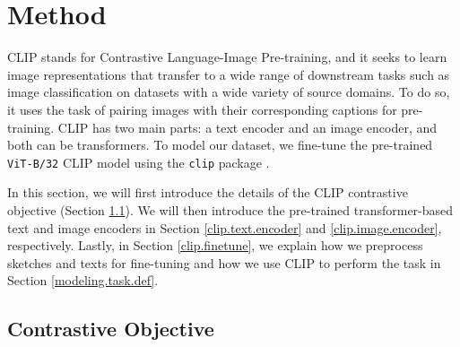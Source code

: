 \section{Method} \label{modeling.method}
CLIP stands for Contrastive Language-Image Pre-training, and it seeks to learn image representations that transfer to a wide range of downstream tasks such as image classification on datasets with a wide variety of source domains. To do so, it uses the task of pairing images with their corresponding captions for pre-training.   
CLIP has two main parts: a text encoder and an image encoder, and both can be transformers. 
To model our dataset, we fine-tune the pre-trained \texttt{ViT-B/32} CLIP model using the \texttt{clip} package \citep{CLIPpaper}. 

In this section, we will first introduce the details of the CLIP contrastive objective (Section \ref{clip.objective}). We will then introduce the pre-trained transformer-based text and image encoders in Section \ref{clip.text.encoder} and \ref{clip.image.encoder}, respectively. Lastly, in Section \ref{clip.finetune}, we explain how we preprocess sketches and texts for fine-tuning and how we use CLIP to perform the task in Section \ref{modeling.task.def}.

\subsection{Contrastive Objective} \label{clip.objective}

